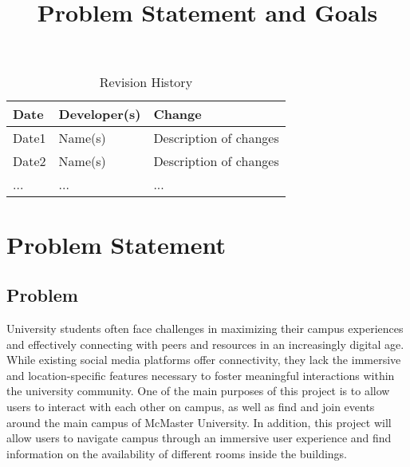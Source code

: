 \documentclass{article}
\title{Problem Statement and Goals\\\progname}
\author{\authname}
\date{}
\begin{document}
\maketitle

\begin{table}[hp]
\caption{Revision History} \label{TblRevisionHistory}
\begin{tabularx}{\textwidth}{llX}
\toprule
\textbf{Date} & \textbf{Developer(s)} & \textbf{Change}\\
\midrule
Date1 & Name(s) & Description of changes\\
Date2 & Name(s) & Description of changes\\
... & ... & ...\\
\bottomrule
\end{tabularx}
\end{table}

\section{Problem Statement}


\subsection{Problem}

\quad University students often face challenges in maximizing their campus experiences and effectively connecting with peers and resources in an increasingly digital age. While existing social media platforms offer connectivity, they lack the immersive and location-specific features necessary to foster meaningful interactions within the university community. One of the main purposes of this project is to allow users to interact with each other on campus, as well as find and join events around the main campus of McMaster University. In addition, this project will allow users to navigate campus through an immersive user experience and find information on the availability of different rooms inside the buildings.
\end{document}
